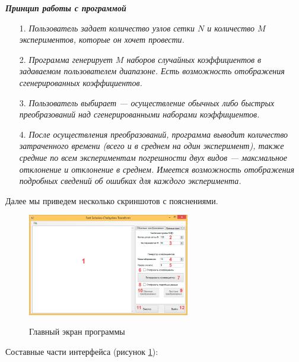 \begin{center}
	\textbf{\textit{Принцип работы с программой}}
\end{center}
\begin{enumerate}
	\item[1.] \textit{
		Пользователь задает количество узлов сетки $N$ и количество $M$ экспериментов, которые он хочет провести.
	}
	\item[2.] \textit{
		Программа генерирует $M$ наборов случайных коэффициентов в задаваемом пользователем диапазоне. Есть возможность отображения сгенерированных коэффициентов.
	}
	\item[3.] \textit{
		Пользователь выбирает --- осуществление обычных либо быстрых преобразований над сгенерированными наборами коэффициентов.
	}
	\item[4.] \textit{
		После осуществления преобразований, программа выводит количество затраченного времени (всего и в среднем на один эксперимент), также средние по всем экспериментам погрешности двух видов --- максмальное отклонение и отклонение в среднем.
		Имеется возможность отображения подробных сведений об ошибках для каждого эксперимента.
	}
\end{enumerate}

Далее мы приведем несколько скриншотов с пояснениями.

\begin{figure}[H]
	\begin{center}
		\includegraphics[width=200pt]{pictures/sms-stn-1(1)}\\
		\caption{Главный экран программы}\label{sms-stn-1-img1}
	\end{center}
\end{figure}

Составные части интерфейса (рисунок \ref{sms-stn-1-img1}):

